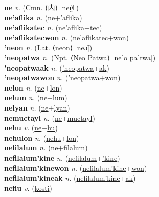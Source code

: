 \textbf{ne} \textit{v.} (Cmn. ⟨内⟩ [neɪ̯˥˩])
 \label{ne} \\
\textbf{ne'aflika} \textit{n.} (\hyperref[ne]{ne}+\hyperref['aflika]{'aflika})
 \label{ne'aflika} \\
\textbf{ne'aflikatec} \textit{n.} (\hyperref[ne'aflika]{ne'aflika}+\hyperref[tec]{tec})
 \label{ne'aflikatec} \\
\textbf{ne'aflikatecwon} \textit{n.} (\hyperref[ne'aflikatec]{ne'aflikatec}+\hyperref[won]{won})
 \label{ne'aflikatecwon} \\
\textbf{'neon} \textit{n.} (Lat. ⟨neon⟩ [neɔ̃])
 \label{'neon} \\
\textbf{'neopatwa} \textit{n.} (Npt. ⟨Neo Patwa⟩ [neˈo paˈtwa])
 \label{'neopatwa} \\
\textbf{'neopatwaak} \textit{n.} (\hyperref['neopatwa]{'neopatwa}+\hyperref[ak]{ak})
 \label{'neopatwaak} \\
\textbf{'neopatwawon} \textit{n.} (\hyperref['neopatwa]{'neopatwa}+\hyperref[won]{won})
 \label{'neopatwawon} \\
\textbf{nelon} \textit{n.} (\hyperref[ne]{ne}+\hyperref[lon]{lon})
 \label{nelon} \\
\textbf{nelum} \textit{n.} (\hyperref[ne]{ne}+\hyperref[lum]{lum})
 \label{nelum} \\
\textbf{nelyan} \textit{n.} (\hyperref[ne]{ne}+\hyperref[lyan]{lyan})
 \label{nelyan} \\
\textbf{nemuctayl} \textit{n.} (\hyperref[ne]{ne}+\hyperref[muctayl]{muctayl})
 \label{nemuctayl} \\
\textbf{nehu} \textit{v.} (\hyperref[ne]{ne}+\hyperref[hu]{hu})
 \label{nehu} \\
\textbf{nehulon} \textit{n.} (\hyperref[nehu]{nehu}+\hyperref[lon]{lon})
 \label{nehulon} \\
\textbf{nefilalum} \textit{n.} (\hyperref[ne]{ne}+\hyperref[filalum]{filalum})
 \label{nefilalum} \\
\textbf{nefilalum'kine} \textit{n.} (\hyperref[nefilalum]{nefilalum}+\hyperref['kine]{'kine})
 \label{nefilalum'kine} \\
\textbf{nefilalum'kinewon} \textit{n.} (\hyperref[nefilalum'kine]{nefilalum'kine}+\hyperref[won]{won})
 \label{nefilalum'kinewon} \\
\textbf{nefilalum'kineak} \textit{n.} (\hyperref[nefilalum'kine]{nefilalum'kine}+\hyperref[ak]{ak})
 \label{nefilalum'kineak} \\
\textbf{neflu} \textit{v.} (\hyperref[kosti]{\sout{kosti}})
 \label{neflu} \\
